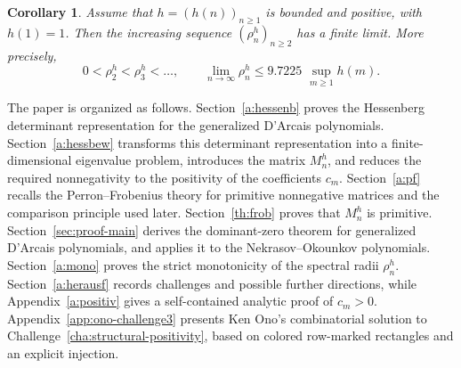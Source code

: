 \documentclass[11pt,reqno]{amsart}
\theoremstyle{plain}
\newtheorem{corollary}[theorem]{Corollary}
\theoremstyle{remark}
\theoremstyle{definition}
\numberwithin{equation}{section}
\begin{document}
\begin{corollary}
Assume that $h=(h(n))_{n\ge1}$ is bounded and positive, with $h(1)=1$. Then the increasing sequence $(\rho_n^h)_{n\ge2}$ has a finite limit. More precisely,
\[
0<\rho_2^h<\rho_3^h<\ldots,
\qquad
\lim_{n\to\infty}\rho_n^h\le 9.7225\,\,\sup_{m\ge1}h(m).
\]
\end{corollary}


The paper is organized as follows. Section~\ref{a:hessenb}
proves the Hessenberg determinant representation for the generalized D'Arcais polynomials. Section~\ref{a:hessbew}
transforms this determinant representation into a finite-dimensional eigenvalue problem, introduces the matrix $M_n^h$, and reduces the required nonnegativity to the positivity of the coefficients $c_m$. Section~\ref{a:pf}
recalls the Perron--Frobenius theory for primitive nonnegative matrices and the comparison principle used later. Section~\ref{th:frob}
proves that $M_n^h$ is primitive. Section~\ref{sec:proof-main}
derives the dominant-zero theorem for %
generalized D'Arcais polynomials, and %
applies it to the Nekrasov--Okounkov polynomials. Section~\ref{a:mono}
proves the strict monotonicity of the spectral radii $\rho_n^h$. Section~\ref{a:herausf}
records challenges and possible further directions, while Appendix~\ref{a:positiv}
gives a self-contained analytic proof of $c_m>0$. Appendix~\ref{app:ono-challenge3} presents Ken Ono's combinatorial solution to Challenge~\ref{cha:structural-positivity}, based on colored row-marked rectangles and an explicit injection.









\end{document}
